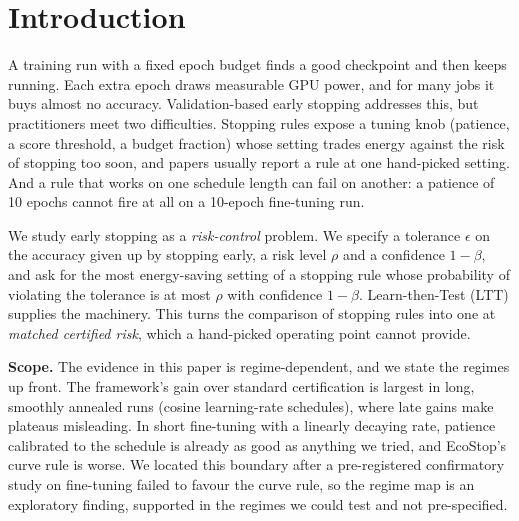 \documentclass[3p,twocolumn,10pt]{elsarticle}
\theoremstyle{definition}
\begin{document}
\section{Introduction}
\label{sec:intro}

A training run with a fixed epoch budget finds a good checkpoint and then keeps running. Each extra epoch draws measurable GPU power, and for many jobs it buys almost no accuracy. Validation-based early stopping addresses this, but practitioners meet two difficulties. Stopping rules expose a tuning knob (patience, a score threshold, a budget fraction) whose setting trades energy against the risk of stopping too soon, and papers usually report a rule at one hand-picked setting. And a rule that works on one schedule length can fail on another: a patience of 10 epochs cannot fire at all on a 10-epoch fine-tuning run.

We study early stopping as a \emph{risk-control} problem. We specify a tolerance $\epsilon$ on the accuracy given up by stopping early, a risk level $\rho$ and a confidence $1-\beta$, and ask for the most energy-saving setting of a stopping rule whose probability of violating the tolerance is at most $\rho$ with confidence $1-\beta$. Learn-then-Test (LTT) \citep{angelopoulos2025ltt} supplies the machinery. This turns the comparison of stopping rules into one at \emph{matched certified risk}, which a hand-picked operating point cannot provide.

\textbf{Scope.} The evidence in this paper is regime-dependent, and we state the regimes up front. The framework's gain over standard certification is largest in long, smoothly annealed runs (cosine learning-rate schedules), where late gains make plateaus misleading. In short fine-tuning with a linearly decaying rate, patience calibrated to the schedule is already as good as anything we tried, and EcoStop's curve rule is worse. We located this boundary after a pre-registered confirmatory study on fine-tuning failed to favour the curve rule, so the regime map is an exploratory finding, supported in the regimes we could test and not pre-specified.
\end{document}
